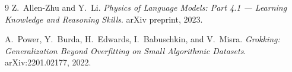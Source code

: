 \documentclass{article}
\begin{document}
\begin{thebibliography}{9}
  Z.\ Allen-Zhu and Y.\ Li.
  \emph{Physics of Language Models: Part 4.1 --- Learning Knowledge
  and Reasoning Skills}.
  arXiv preprint, 2023.

  A.\ Power, Y.\ Burda, H.\ Edwards, I.\ Babuschkin, and V.\ Misra.
  \emph{Grokking: Generalization Beyond Overfitting on Small Algorithmic Datasets}.
  arXiv:2201.02177, 2022.
\end{thebibliography}
\end{document}
